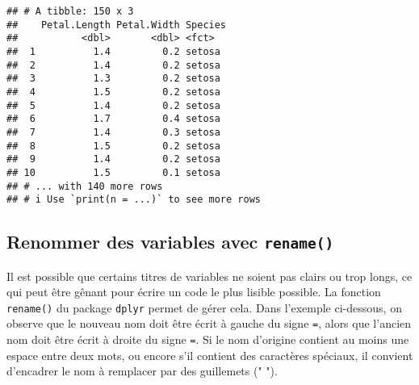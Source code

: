 \documentclass[
  french,
]{book}
\newenvironment{Shaded}{\begin{snugshade}}{\end{snugshade}}
\newcommand{\DataTypeTok}[1]{\textcolor[rgb]{0.13,0.29,0.53}{#1}}
\newcommand{\KeywordTok}[1]{\textcolor[rgb]{0.13,0.29,0.53}{\textbf{#1}}}
\newcommand{\NormalTok}[1]{#1}
\newcommand{\OperatorTok}[1]{\textcolor[rgb]{0.81,0.36,0.00}{\textbf{#1}}}
\newcommand{\StringTok}[1]{\textcolor[rgb]{0.31,0.60,0.02}{#1}}
\begin{document}
\begin{Shaded}
\end{Shaded}

\begin{verbatim}
## # A tibble: 150 x 3
##    Petal.Length Petal.Width Species
##           <dbl>       <dbl> <fct>  
##  1          1.4         0.2 setosa 
##  2          1.4         0.2 setosa 
##  3          1.3         0.2 setosa 
##  4          1.5         0.2 setosa 
##  5          1.4         0.2 setosa 
##  6          1.7         0.4 setosa 
##  7          1.4         0.3 setosa 
##  8          1.5         0.2 setosa 
##  9          1.4         0.2 setosa 
## 10          1.5         0.1 setosa 
## # ... with 140 more rows
## # i Use `print(n = ...)` to see more rows
\end{verbatim}

\hypertarget{renommer-des-variables-avec-rename}{%
\subsection{\texorpdfstring{Renommer des variables avec \texttt{rename()}}{Renommer des variables avec rename()}}\label{renommer-des-variables-avec-rename}}

Il est possible que certains titres de variables ne soient pas clairs ou trop longs, ce qui peut être gênant pour écrire un code le plus lisible possible. La fonction \texttt{rename()} du package \texttt{dplyr} permet de gérer cela. Dans l'exemple ci-dessous, on observe que le nouveau nom doit être écrit à gauche du signe \texttt{=}, alors que l'ancien nom doit être écrit à droite du signe \texttt{=}. Si le nom d'origine contient au moins une espace entre deux mots, ou encore s'il contient des caractères spéciaux, il convient d'encadrer le nom à remplacer par des guillemets (" ").

\begin{Shaded}
\end{Shaded}
\end{document}
